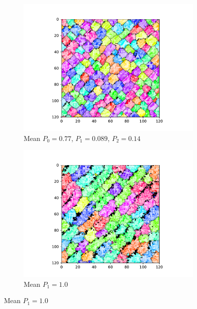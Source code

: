 \begin{figure}[t]
\begin{center}
\begin{subfigure}[b]{0.82\columnwidth}
  \includegraphics[width=\columnwidth,trim={2.5cm 0.5cm 2.5cm 1cm},clip]{img/ChannelMap_1022_update19500000}
  \caption{Mean $P_0 = 0.77$, $P_1 = 0.089$, $P_2 = 0.14$}
  \label{fig:ChannelMap_1022}
\end{subfigure}

\begin{subfigure}[b]{0.82\columnwidth}
  \includegraphics[width=\columnwidth,trim={2.5cm 0.5cm 2.5cm 1cm},clip]{img/ChannelMap_1041_update19500000}
  \caption{Mean $P_1 = 1.0$}
  \label{fig:ChannelMap_1041}
\end{subfigure}


\end{center}
\end{figure}
